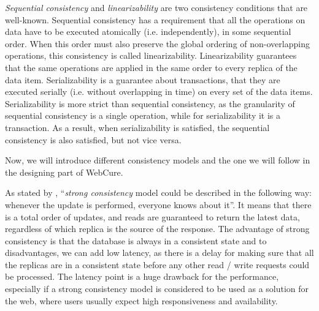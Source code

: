 \textit{Sequential consistency} and \textit{linearizability} are two consistency conditions that are well-known. Sequential consistency has a requirement that all the operations on data have to be executed atomically (i.e. independently), in some sequential order\cite{55}. When this order must also preserve the global ordering of non-overlapping operations, this consistency is called linearizability\cite{27}. Linearizability guarantees that the same operations are applied in the same order to every replica of the data item\cite{12}. Serializability is a guarantee about transactions, that they are executed serially (i.e. without overlapping in time) on every set of the data items\cite{12}. Serializability is more strict than sequential consistency, as the granularity of sequential consistency is a single operation, while for serializability it is a transaction. As a result, when serializability is satisfied, the sequential consistency is also satisfied, but not vice versa.

Now, we will introduce different consistency models and the one we will follow in the designing part of WebCure. 

As stated by \citet{10}, ``\textit{strong consistency} model could be described in the following way: whenever the update is performed, everyone knows about it''. It means that there is a total order of updates, and reads are guaranteed to return the latest data, regardless of which replica is the source of the response. The advantage of strong consistency is that the database is always in a consistent state and to disadvantages, we can add low latency, as there is a delay for making sure that all the replicas are in a consistent state before any other read / write requests could be processed. The latency point is a huge drawback for the performance, especially if a strong consistency model is considered to be used as a solution for the web, where users usually expect high responsiveness and availability. 

